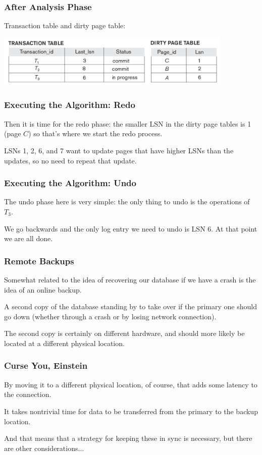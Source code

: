 \begin{frame}
\frametitle{After Analysis Phase}

Transaction table and dirty page table:

\begin{center}
\includegraphics[width=0.85\textwidth]{images/aries-3}
\end{center}


\end{frame}


\begin{frame}
\frametitle{Executing the Algorithm: Redo}

Then it is time for the redo phase: the smaller LSN in the dirty page tables is 1 (page $C$) so that's where we start the redo process. 

LSNs 1, 2, 6, and 7 want to update pages that have higher LSNs than the updates, so no need to repeat that update.


\end{frame}


\begin{frame}
\frametitle{Executing the Algorithm: Undo}

The undo phase here is very simple: the only thing to undo is the operations of $T_{3}$. 

We go backwards and the only log entry we need to undo is LSN 6. At that point we are all done.


\end{frame}


\begin{frame}
\frametitle{Remote Backups}

Somewhat related to the idea of recovering our database if we have a crash is the idea of an online backup. 

A second copy of the database standing by to take over if the primary one should go down (whether through a crash or by losing network connection). 

The second copy is certainly on different hardware, and should more likely be located at a different physical location. 

\end{frame}


\begin{frame}
\frametitle{Curse You, Einstein}

By moving it to a different physical location, of course, that adds some latency to the connection. 

It takes nontrivial time for data to be transferred from the primary to the backup location. 

And that means that a strategy for keeping these in sync is necessary, but there are other considerations...

\end{frame}


